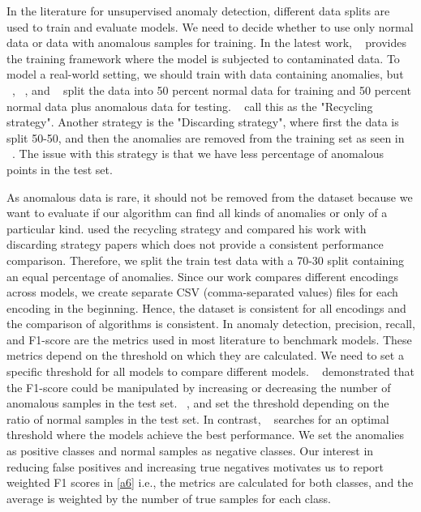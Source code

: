 \documentclass{article}
\begin{document}
In the literature for unsupervised anomaly detection, different data splits are used to train and evaluate models. We need to decide whether to use only normal data or data with anomalous samples for training. In the latest work, ~\citep{qiu2022latent} provides the training framework where the model is subjected to contaminated data. To model a real-world setting, we should train with data containing anomalies, but ~\citep{dagmm}, ~\citep{zenati}, and ~\citep{bergman} split the data into 50 percent normal data for training and 50 percent normal data plus anomalous data for testing. ~\citep{recent2022}  call this as the "Recycling strategy". Another strategy is the "Discarding strategy", where first the data is split 50-50, and then the anomalies are removed from the training set as seen in  ~\citep{zhai2016deep}. The issue with this strategy is that we have less percentage of anomalous points in the test set.

As anomalous data is rare, it should not be removed from the dataset because we want to evaluate if our algorithm can find all kinds of anomalies or only of a particular kind. \citep{zenati} used the recycling strategy and compared his work with discarding strategy papers which does not provide a consistent performance comparison. Therefore, we split the train test data with a 70-30 split containing an equal percentage of anomalies. Since our work compares different encodings across models, we create separate CSV (comma-separated values) files for each encoding in the beginning. Hence, the dataset is consistent for all encodings and the comparison of algorithms is consistent. In anomaly detection, precision, recall, and F1-score are the metrics used in most literature to benchmark models. These metrics depend on the threshold on which they are calculated. We need to set a specific threshold for all models to compare different models. ~\citep{fourure2021anomaly} demonstrated that the F1-score could be manipulated by increasing or decreasing the number of anomalous samples in the test set. ~\citep{dagmm}, \citep{zenati} and\citep{bergman} set the threshold  depending on the ratio of normal samples in the test set. In contrast, ~\citep{qiu2021neural} searches for an optimal threshold where the models achieve the best performance. We set the anomalies as positive classes and normal samples as negative classes. Our interest in reducing false positives and increasing true negatives motivates us to report weighted F1 scores in \ref{a6} i.e., the metrics are calculated for both classes, and the average is weighted by the number of true samples for each class.
\end{document}
